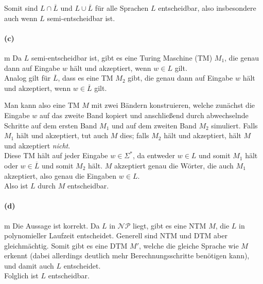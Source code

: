 	Somit sind $L \cap \overline{L}$ und $L \cup \overline{L}$ für alle Sprachen $L$ entscheidbar, also insbesondere auch wenn $L$ semi-entscheidbar ist.

\paragraph{(c)}m
	Da $L$ semi-entscheidbar ist, gibt es eine Turing Maschine (TM) $M_1$, die genau dann auf Eingabe $w$ hält und akzeptiert, wenn $w \in L$ gilt.\\
 	Analog gilt für $\overline{L}$, dass es eine TM $M_2$ gibt, die genau dann auf Eingabe $w$ hält und akzeptiert, wenn $w \in \overline{L}$ gilt.

	Man kann also eine TM $M$ mit zwei Bändern konstruieren, welche zunächst die Eingabe $w$ auf das zweite Band kopiert und anschließend durch abwechselnde Schritte auf dem ersten Band $M_1$ und auf dem zweiten Band $M_2$ simuliert. Falls $M_1$ hält und akzeptiert, tut auch $M$ dies; falls $M_2$ hält und akzeptiert, hält $M$ und akzeptiert \textit{nicht}.\\
	Diese TM hält auf jeder Eingabe $w \in \Sigma^*$, da entweder $w \in L$ und somit $M_1$ hält oder $w \in \overline{L}$ und somit $M_2$ hält. $M$ akzeptiert genau die Wörter, die auch $M_1$ akzeptiert, also genau die Eingaben $w \in L$.\\
	Also ist $L$ durch $M$ entscheidbar.
	
\paragraph{(d)}m	
	Die Aussage ist korrekt. Da $L$ in $\mathcal{NP}$ liegt, gibt es eine NTM $M$, die $L$ in polynomieller Laufzeit entscheidet. Generell sind NTM und DTM aber gleichmächtig. Somit gibt es eine DTM $M'$, welche die gleiche Sprache wie $M$ erkennt (dabei allerdings deutlich mehr Berechnungsschritte benötigen kann), und damit auch $L$ entscheidet.\\
	Folglich ist $L$ entscheidbar.
	


\newpage